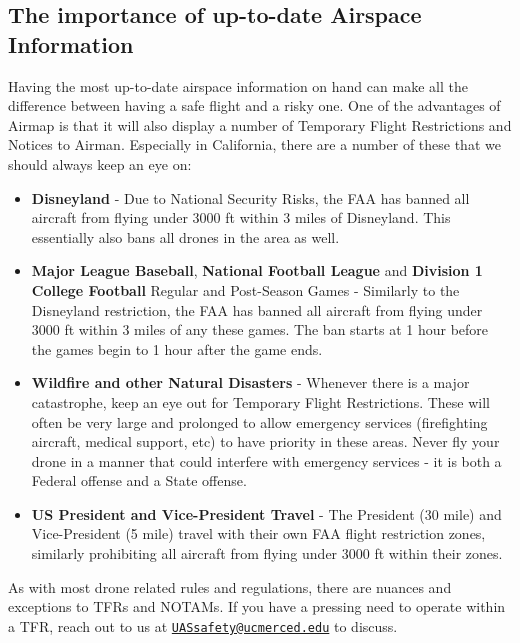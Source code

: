 \documentclass[
  12pt,
]{book}
\providecommand{\tightlist}{%
  \setlength{\itemsep}{0pt}\setlength{\parskip}{0pt}}
\newenvironment{notebox}{
  \definecolor{shadecolor}{gray}{.8}  %
  \color{black}
  \begin{shaded}}
 {\end{shaded}}
\begin{document}
\subsection{The importance of up-to-date Airspace Information}\label{the-importance-of-up-to-date-airspace-information}

Having the most up-to-date airspace information on hand can make all the difference between having a safe flight and a risky one. One of the advantages of Airmap is that it will also display a number of Temporary Flight Restrictions and Notices to Airman. Especially in California, there are a number of these that we should always keep an eye on:

\begin{itemize}
\tightlist
\item
  \textbf{Disneyland} - Due to National Security Risks, the FAA has banned all aircraft from flying under 3000 ft within 3 miles of Disneyland. This essentially also bans all drones in the area as well.\\
\item
  \textbf{Major League Baseball}, \textbf{National Football League} and \textbf{Division 1 College Football} Regular and Post-Season Games - Similarly to the Disneyland restriction, the FAA has banned all aircraft from flying under 3000 ft within 3 miles of any these games. The ban starts at 1 hour before the games begin to 1 hour after the game ends.\\
\item
  \textbf{Wildfire and other Natural Disasters} - Whenever there is a major catastrophe, keep an eye out for Temporary Flight Restrictions. These will often be very large and prolonged to allow emergency services (firefighting aircraft, medical support, etc) to have priority in these areas. Never fly your drone in a manner that could interfere with emergency services - it is both a Federal offense and a State offense.\\
\item
  \textbf{US President and Vice-President Travel} - The President (30 mile) and Vice-President (5 mile) travel with their own FAA flight restriction zones, similarly prohibiting all aircraft from flying under 3000 ft within their zones.
\end{itemize}

\begin{notebox}
As with most drone related rules and regulations, there are nuances and exceptions to TFRs and NOTAMs. If you have a pressing need to operate within a TFR, reach out to us at \href{mailto:UASsafety@ucmerced.edu}{\nolinkurl{UASsafety@ucmerced.edu}} to discuss.

\end{notebox}
\end{document}
